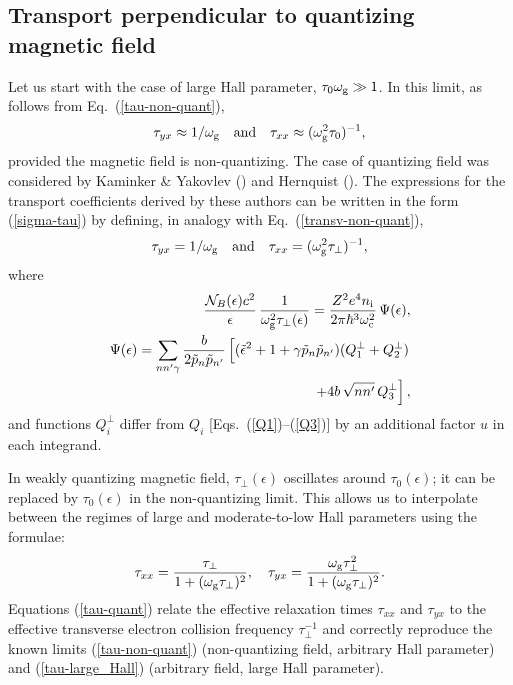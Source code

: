 \documentclass{aa}
\newcommand{\beq}{\begin{equation}}
\newcommand{\eeq}{\end{equation}}
\newcommand{\req}[1]{Eq.~(\ref{#1})}
\newcommand{\omc}{\omega_{\rm c}}
\newcommand{\omg}{\omega_{\rm g}}
\newcommand{\Ne}{{\cal N}_B(\epsilon)}
\begin{document}
\subsection{Transport perpendicular to quantizing magnetic field}
%
Let us start with the case of large Hall parameter,
$\tau_0 \omg \gg 1$.
In this limit, as follows from \req{tau-non-quant},
\beq
   \tau_{yx}\approx1/\omg
\quad{\rm and}\quad
   \tau_{xx}\approx(\omg^2 \tau_0)^{-1},
\label{transv-non-quant}
\eeq
provided the magnetic field is non-quantizing.
The case of quantizing field
was considered
by Kaminker \& Yakovlev (\cite{kayak}) and Hernquist (\cite{hern84}).
The expressions for the transport coefficients
derived by these authors
can be written in the form (\ref{sigma-tau})
by defining, in analogy with \req{transv-non-quant},
\beq
   \tau_{yx}=1/\omg
\quad{\rm and}\quad
   \tau_{xx}=(\omg^2 \tau_\perp)^{-1}, 
\label{tau-large_Hall}
\eeq
where
\begin{eqnarray}
&&\hspace*{-.9em}
  {\Ne c^2\over\epsilon}\,{1\over \omg^2 \tau_\perp(\epsilon)} =
 {Z^2 e^4 n_{\rm i} \over 2\pi\hbar^3 \omc^2}\,\Psi(\epsilon),
\label{Psi1}
\\&&\hspace*{-.9em}
   \Psi(\epsilon) = \sum_{nn'\gamma}
     {b\over 2 \tilde p_n \tilde p_{n'} }
        \left[ (\tilde\epsilon^2+1+\gamma\tilde p_n \tilde p_{n'})
            (Q_1^\perp + Q_2^\perp)
\vphantom{\sqrt{nn'}}\right.\nonumber\\&& \qquad \left.
         + 4b\,\sqrt{nn'}\,Q_3^\perp \right],
\label{Psi}
\end{eqnarray}
and functions $Q_i^\perp$ differ from $Q_i$
[Eqs.~(\ref{Q1})--(\ref{Q3})]
by an additional factor $u$ in each integrand.

In weakly quantizing magnetic field,
$\tau_\perp(\epsilon)$
oscillates around $\tau_0(\epsilon)$;
it can be replaced by $\tau_0(\epsilon)$
in the non-quantizing limit.
This allows us to interpolate
between the regimes of large and moderate-to-low
Hall parameters using the formulae:
\beq
   \tau_{xx}={\tau_\perp\over 1+(\omg\tau_\perp)^2},
\quad
   \tau_{yx}={\omg\tau_\perp^2\over 1+(\omg\tau_\perp)^2}.
\label{tau-quant}
\eeq
Equations (\ref{tau-quant})
relate the effective relaxation times $\tau_{xx}$ and $\tau_{yx}$
to the effective transverse electron
collision frequency $\tau_{\perp}^{-1}$ and
correctly reproduce the known
limits (\ref{tau-non-quant}) (non-quantizing field,
arbitrary Hall parameter)
and (\ref{tau-large_Hall}) (arbitrary field,
large Hall parameter).
\end{document}
